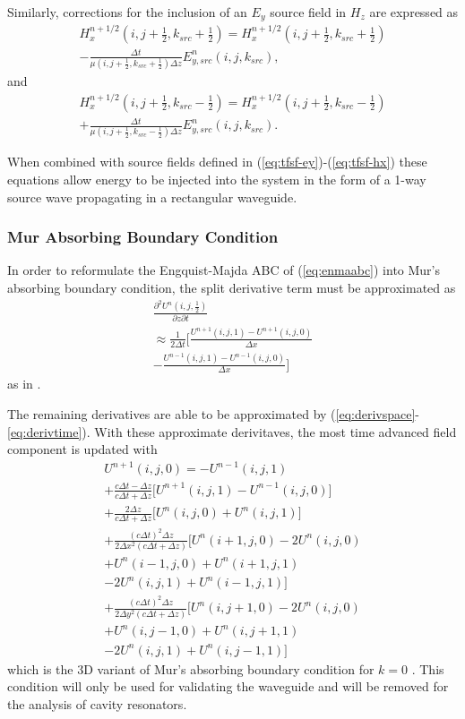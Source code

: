 Similarly, corrections for the inclusion of an $E_y$ source field in $H_z$ are expressed as
\begin{multline}
	H_x^{n+1/2}(i,j+\tfrac{1}{2},k_{src}+\tfrac{1}{2}) = H_x^{n+1/2}(i,j+\tfrac{1}{2},k_{src}+\tfrac{1}{2}) \\
	-\frac{\Delta t}{\mu(i,j+\tfrac{1}{2},k_{src}+\tfrac{1}{2})\Delta z}E_{y,src}^n(i,j,k_{src}),
\end{multline}
and
\begin{multline}
	H_x^{n+1/2}(i,j+\tfrac{1}{2},k_{src}-\tfrac{1}{2}) = H_x^{n+1/2}(i,j+\tfrac{1}{2},k_{src}-\tfrac{1}{2}) \\
	+\frac{\Delta t}{\mu(i,j+\tfrac{1}{2},k_{src}-\tfrac{1}{2})\Delta z}E_{y,src}^n(i,j,k_{src}).
\end{multline}

When combined with source fields defined in  (\ref{eq:tfsf-ey})-(\ref{eq:tfsf-hx}) these equations allow energy to be injected into the system in the form of a 1-way source wave propagating in a rectangular waveguide\cite{taftlovefdtd}.

\subsubsection{Mur Absorbing Boundary Condition}
\label{subsubsec:mur-timestep}
In order to reformulate the Engquist-Majda ABC of  (\ref{eq:enmaabc}) into Mur's absorbing boundary condition, the split derivative term must be approximated as
\begin{multline}
	\frac{\partial^2 U^n(i,j,\tfrac{1}{2})}{\partial z\partial t} \\ \approx\frac{1}{2\Delta t}\bigg[\frac{U^{n+1}(i,j,1)-U^{n+1}(i,j,0)}{\Delta x} \\ -\frac{U^{n-1}(i,j,1)-U^{n-1}(i,j,0)}{\Delta x}\bigg]
\end{multline}
as in \cite{taftlovefdtd}.

The remaining derivatives are able to be approximated by  (\ref{eq:derivspace}-\ref{eq:derivtime}). With these approximate derivitaves, the most time advanced field component is updated with
\begin{multline}
	U^{n+1}(i,j,0) = -U^{n-1}(i,j,1) \\
	+\frac{c\Delta t - \Delta z}{c\Delta t + \Delta z}\bigg[U^{n+1}(i,j,1)-U^{n-1}(i,j,0)\bigg] \\ 
	+\frac{2\Delta z}{c\Delta t+\Delta z}\bigg[U^n(i,j,0)+U^n(i,j,1)\bigg] \\
	+\frac{(c\Delta t)^2\Delta z}{2\Delta x^2(c\Delta t+\Delta z)}\bigg[U^n(i+1,j,0)-2U^n(i,j,0) \\ 
	+U^n(i-1,j,0) + U^n(i+1,j,1) \\ -2U^n(i,j,1)+U^n(i-1,j,1)\bigg] \\ 
	+\frac{(c\Delta t)^2\Delta z}{2\Delta y^2(c\Delta t+\Delta z)}\bigg[U^n(i,j+1,0)-2U^n(i,j,0) \\ 
	+U^n(i,j-1,0) + U^n(i,j+1,1) \\ -2U^n(i,j,1)+U^n(i,j-1,1)\bigg]
\end{multline}
which is the 3D variant of Mur's absorbing boundary condition for $k=0$ \cite{taftlovefdtd}. This condition will only be used for validating the waveguide and will be removed for the analysis of cavity resonators.